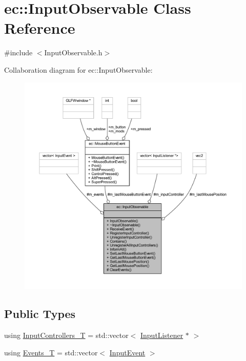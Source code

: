 \hypertarget{classec_1_1_input_observable}{}\section{ec\+:\+:Input\+Observable Class Reference}
\label{classec_1_1_input_observable}


{\ttfamily \#include $<$Input\+Observable.\+h$>$}



Collaboration diagram for ec\+:\+:Input\+Observable\+:
\nopagebreak
\begin{figure}[H]
\begin{center}
\leavevmode
\includegraphics[width=350pt]{classec_1_1_input_observable__coll__graph}
\end{center}
\end{figure}
\subsection*{Public Types}
\begin{DoxyCompactItemize}
\item 
using \mbox{\hyperlink{classec_1_1_input_observable_afd4bca548fe9829c5fc6c0ab33254162}{Input\+Controllers\+\_\+T}} = std\+::vector$<$ \mbox{\hyperlink{classec_1_1_input_listener}{Input\+Listener}} $\ast$ $>$
\item 
using \mbox{\hyperlink{classec_1_1_input_observable_a9b63c8acbcbfc0f99d2964493ac52925}{Events\+\_\+T}} = std\+::vector$<$ \mbox{\hyperlink{structec_1_1_input_event}{Input\+Event}} $>$
\end{DoxyCompactItemize}
